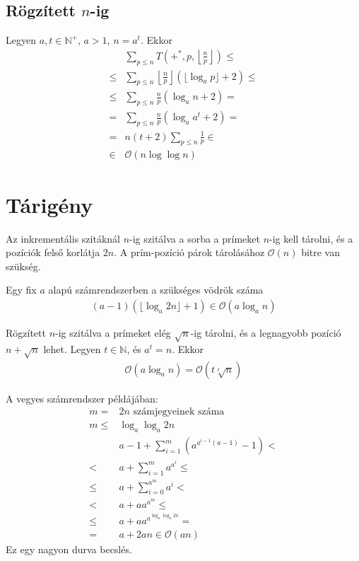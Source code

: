 \documentclass{article}
\begin{document}
\subsection{Rögzített $n$-ig}

Legyen $a, t \in \mathbb{N}^+$, $a > 1$, $n = a^t$.
Ekkor
\begin{align*}
& \sum_{p \le n} T(+^*, p, \left\lfloor \frac{n}{p} \right\rfloor ) \le \\
\le& \sum_{p \le n} \left\lfloor \frac{n}{p} \right\rfloor ( \lfloor \log_{a}{p} \rfloor + 2 ) \le \\
\le& \sum_{p \le n} \frac{n}{p} ( \log_{a}{n} + 2 ) = \\
=& \sum_{p \le n} \frac{n}{p} ( \log_{a}{a^t} + 2 ) = \\
=& n (t+2) \sum_{p \le n} \frac{1}{p} \in \\
\in & \mathcal{O}(n \log{\log{n}})
\end{align*}

\section{Tárigény}

Az inkrementális szitáknál $n$-ig szitálva a sorba a prímeket $n$-ig kell tárolni, és a pozíciók felső korlátja $2n$. A prím-pozíció párok tárolásához $\mathcal{O}(n)$ bitre van szükség.

Egy fix $a$ alapú számrendszerben a szükséges vödrök száma
\begin{align*}
(a-1) (\lfloor \log_{a}{2n} \rfloor +1 ) \in \mathcal{O}(a \log_{a}{n})
\end{align*}

Rögzített $n$-ig szitálva a prímeket elég $\sqrt{n}$-ig tárolni, és a legnagyobb pozíció $n+\sqrt{n}$ lehet.
Legyen $t \in \mathbb{N}$, és $a^t = n$. Ekkor
\begin{align*}
\mathcal{O}(a \log_{a}{n}) = \mathcal{O}(t \sqrt[t]{n})
\end{align*}

A vegyes számrendszer példájában:
\begin{align*}
m =& 2n \text{ számjegyeinek száma} \\
m \le& \log_{a}{\log_{a}{2n}} \\
& a-1 + \sum_{i=1}^{m} \left( a^{a^{i-1}(a-1)} - 1 \right) < \\
<& a + \sum_{i=1}^{m} a^{a^{i}} \le \\
\le& a + \sum_{i=0}^{a^m} a^i < \\
<& a+ a a^{a^m} \le \\
\le& a+ a a^{a^{\log_{a}{\log_{a}{2n}}}} = \\
=& a+2an \in \mathcal{O}(an)
\end{align*}
Ez egy nagyon durva becslés.
\end{document}
